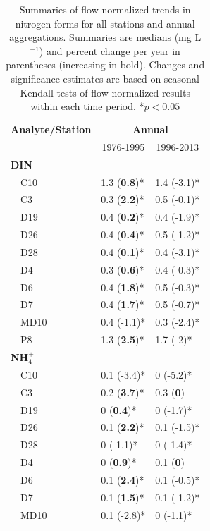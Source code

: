 \documentclass[letterpaper,12pt,oneside]{article}\usepackage[]{graphicx}\usepackage[]{color}
\begin{document}
\begin{table}[!tbp]
\caption{Summaries of flow-normalized trends in nitrogen forms for all stations and annual aggregations. Summaries are  medians (mg L$^{-1}$) and percent change per year in parentheses (increasing in bold). Changes and significance estimates are based on seasonal Kendall tests of flow-normalized results within each time period. *$p<0.05$\label{tab:trndsann}} 
\begin{center}
\begin{tabular}{lll}
\hline\hline
\multicolumn{1}{l}{\bfseries Analyte/Station}&\multicolumn{2}{c}{\bfseries Annual}\tabularnewline
\cline{2-3}
\multicolumn{1}{l}{}&\multicolumn{1}{c}{1976-1995}&\multicolumn{1}{c}{1996-2013}\tabularnewline
\hline
{\bfseries DIN}&&\tabularnewline
~~C10&1.3 \footnotesize{(\textbf{0.8})*}&1.4 \footnotesize{(-3.1)*}\tabularnewline
~~C3&0.3 \footnotesize{(\textbf{2.2})*}&0.5 \footnotesize{(-0.1)*}\tabularnewline
~~D19&0.4 \footnotesize{(\textbf{0.2})*}&0.4 \footnotesize{(-1.9)*}\tabularnewline
~~D26&0.4 \footnotesize{(\textbf{0.4})*}&0.5 \footnotesize{(-1.2)*}\tabularnewline
~~D28&0.4 \footnotesize{(\textbf{0.1})*}&0.4 \footnotesize{(-3.1)*}\tabularnewline
~~D4&0.3 \footnotesize{(\textbf{0.6})*}&0.4 \footnotesize{(-0.3)*}\tabularnewline
~~D6&0.4 \footnotesize{(\textbf{1.8})*}&0.5 \footnotesize{(-0.3)*}\tabularnewline
~~D7&0.4 \footnotesize{(\textbf{1.7})*}&0.5 \footnotesize{(-0.7)*}\tabularnewline
~~MD10&0.4 \footnotesize{(-1.1)*}&0.3 \footnotesize{(-2.4)*}\tabularnewline
~~P8&1.3 \footnotesize{(\textbf{2.5})*}&1.7 \footnotesize{(-2)*}\tabularnewline
\hline
{\bfseries NH$_{4}^{+}$}&&\tabularnewline
~~C10&0.1 \footnotesize{(-3.4)*}&0 \footnotesize{(-5.2)*}\tabularnewline
~~C3&0.2 \footnotesize{(\textbf{3.7})*}&0.3 \footnotesize{(\textbf{0})}\tabularnewline
~~D19&0 \footnotesize{(\textbf{0.4})*}&0 \footnotesize{(-1.7)*}\tabularnewline
~~D26&0.1 \footnotesize{(\textbf{2.2})*}&0.1 \footnotesize{(-1.5)*}\tabularnewline
~~D28&0 \footnotesize{(-1.1)*}&0 \footnotesize{(-1.4)*}\tabularnewline
~~D4&0 \footnotesize{(\textbf{0.9})*}&0.1 \footnotesize{(\textbf{0})}\tabularnewline
~~D6&0.1 \footnotesize{(\textbf{2.4})*}&0.1 \footnotesize{(-0.5)*}\tabularnewline
~~D7&0.1 \footnotesize{(\textbf{1.5})*}&0.1 \footnotesize{(-1.2)*}\tabularnewline
~~MD10&0.1 \footnotesize{(-2.8)*}&0 \footnotesize{(-1.1)*}\tabularnewline

\end{tabular}
\end{center}
\end{table}
\end{document}
